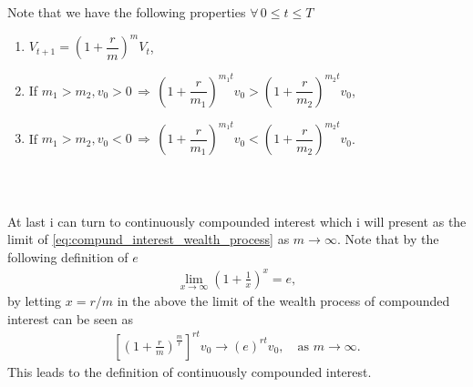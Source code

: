 \documentclass{beamer}
\numberwithin{equation}{section}
\begin{document}
\begin{frame}\frametitle{{\normalsize \secname} \\ {\large \subsecname}}
    Note that we have the following properties $\forall\, 0 \leq t \leq T$
    \begin{enumerate}
        \item $V_{t + 1} = \left( 1 + \dfrac{r}{m} \right)^{m}V_t$,
        \item If $m_1 > m_2, v_0 > 0
        \, \Rightarrow \,
        \left( 1 + \dfrac{r}{m_1} \right)^{m_1t}v_0
        >
        \left( 1 + \dfrac{r}{m_2} \right)^{m_2t}v_0$,
        \item If $m_1 > m_2, v_0 < 0
        \, \Rightarrow \,
        \left( 1 + \dfrac{r}{m_1} \right)^{m_1t}v_0
        <
        \left( 1 + \dfrac{r}{m_2} \right)^{m_2t}v_0$.
    \end{enumerate}
\end{frame}

\begin{frame}\frametitle{{\normalsize \secname} \\ {\large \subsecname}}
    At last i can turn to continuously compounded interest which i will present as the limit of \eqref{eq:compund_interest_wealth_process} as $m \rightarrow \infty$.
    Note that by the following definition of $e$
    \begin{align}
        \lim_{x \rightarrow \infty} \left(1 + \frac{1}{x}\right)^x = e,
    \end{align}
    by letting $x = r/m$ in the above the limit of the wealth process of compounded interest can be seen as
    \begin{align}
        \left[\left( 1 + \frac{r}{m} \right)^\frac{m}{r}\right]^{rt}v_0 \rightarrow
        (e)^{rt}v_0, \quad \text{as } m \rightarrow \infty.
    \end{align}
    This leads to the definition of continuously compounded interest.
\end{frame}

\end{document}
